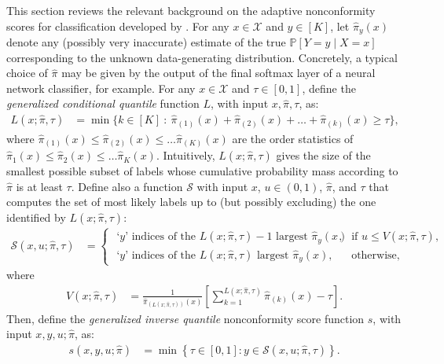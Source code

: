 This section reviews the relevant background on the adaptive nonconformity scores for classification developed by \citet{romano2020classification}.
For any $x \in \mathcal{X}$ and $y \in [K]$, let $\hat{\pi}_{y}(x)$ denote any (possibly very inaccurate) estimate of the true $\mathbb{P}[ Y = y \mid X =x]$ corresponding to the unknown data-generating distribution. Concretely, a typical choice of $\hat{\pi}$ may be given by the output of the final softmax layer of a neural network classifier, for example.
 For any $x \in \mathcal{X}$ and $\tau \in [0,1]$, define the \emph{generalized conditional quantile} function $L$, with input $x, \hat{\pi}, \tau$, as:
\begin{align} \label{eq:oracle-threshold}
  L(x; \hat{\pi}, \tau) & = \min \{ k \in [K] \ : \ \hat{\pi}_{(1)}(x) + \hat{\pi}_{(2)}(x) + \ldots + \hat{\pi}_{(k)}(x) \geq \tau \},
  \end{align}
where $\hat{\pi}_{(1)}(x) \leq \hat{\pi}_{(2)}(x) \leq \ldots \hat{\pi}_{(K)}(x)$ are the order statistics of $\hat{\pi}_{1}(x) \leq \hat{\pi}_{2}(x) \leq \ldots \hat{\pi}_{K}(x)$.
Intuitively, $L(x; \hat{\pi}, \tau)$ gives the size of the smallest possible subset of labels whose cumulative probability mass according to $\hat{\pi}$ is at least $\tau$.
Define also a function $\mathcal{S}$ with input $x$, $u \in (0,1)$, $\hat{\pi}$, and $\tau$ that computes the set of most likely labels up to (but possibly excluding) the one identified by $L(x; \hat{\pi}, \tau)$:
\begin{align} \label{eq:define-S}
    \mathcal{S}(x, u ; \hat{\pi}, \tau) & =
    \begin{cases}
    \text{ `$y$' indices of the $L(x ; \hat{\pi},\tau)-1$ largest $\hat{\pi}_{y}(x)$},
    & \text{ if } u \leq V(x ; \hat{\pi},\tau) , \\
    \text{ `$y$' indices of the $L(x ; \hat{\pi},\tau)$ largest $\hat{\pi}_{y}(x)$},
    & \text{ otherwise},
    \end{cases}
\end{align}
where
\begin{align*}
    V(x; \hat{\pi}, \tau) & =  \frac{1}{\hat{\pi}_{(L(x ; \hat{\pi}, \tau))}(x)} \left[\sum_{k=1}^{L(x ; \hat{\pi}, \tau)} \hat{\pi}_{(k)}(x) - \tau \right].
\end{align*}
Then, define the \textit{generalized inverse quantile} nonconformity score function $s$, with input $x,y,u;\hat{\pi}$, as:
\begin{align} \label{eq:define-scores}
    s(x,y,u;\hat{\pi}) & = \min \left\{ \tau \in [0,1] : y \in \mathcal{S}(x, u ; \hat{\pi}, \tau) \right\}.
\end{align}
